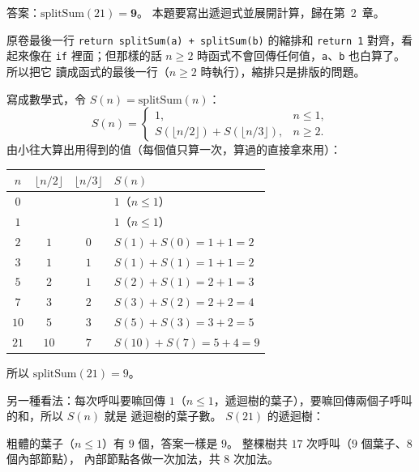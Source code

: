 \begin{pastsoln}
答案：$\mathrm{splitSum}(21) = \mathbf{9}$。 本題要寫出遞迴式並展開計算，歸在第~2~章。

原卷最後一行 \texttt{return splitSum(a) + splitSum(b)} 的縮排和 \texttt{return 1} 對齊，看起來像在
\texttt{if} 裡面；但那樣的話 $n \ge 2$ 時函式不會回傳任何值，\texttt{a}、\texttt{b} 也白算了。 所以把它
讀成函式的最後一行（$n \ge 2$ 時執行），縮排只是排版的問題。

寫成數學式，令 $S(n) = \mathrm{splitSum}(n)$：
\[
S(n) = \begin{cases} 1, & n \le 1, \\ S(\lfloor n/2 \rfloor) + S(\lfloor n/3 \rfloor), & n \ge 2. \end{cases}
\]
由小往大算出用得到的值（每個值只算一次，算過的直接拿來用）：
\begin{center}
\small
\begin{tabular}{cccl}
\toprule
$n$ & $\lfloor n/2 \rfloor$ & $\lfloor n/3 \rfloor$ & $S(n)$ \\
\midrule
$0$ & & & $1$（$n \le 1$） \\
$1$ & & & $1$（$n \le 1$） \\
$2$ & $1$ & $0$ & $S(1) + S(0) = 1 + 1 = 2$ \\
$3$ & $1$ & $1$ & $S(1) + S(1) = 1 + 1 = 2$ \\
$5$ & $2$ & $1$ & $S(2) + S(1) = 2 + 1 = 3$ \\
$7$ & $3$ & $2$ & $S(3) + S(2) = 2 + 2 = 4$ \\
$10$ & $5$ & $3$ & $S(5) + S(3) = 3 + 2 = 5$ \\
$21$ & $10$ & $7$ & $S(10) + S(7) = 5 + 4 = 9$ \\
\bottomrule
\end{tabular}
\end{center}
所以 $\mathrm{splitSum}(21) = 9$。

另一種看法：每次呼叫要嘛回傳 $1$（$n \le 1$，遞迴樹的葉子），要嘛回傳兩個子呼叫的和，所以 $S(n)$ 就是
遞迴樹的葉子數。 $S(21)$ 的遞迴樹：
\begin{center}
\end{center}
粗體的葉子（$n \le 1$）有 $9$ 個，答案一樣是 $9$。 整棵樹共 $17$ 次呼叫（$9$ 個葉子、$8$ 個內部節點），
內部節點各做一次加法，共 $8$ 次加法。
\end{pastsoln}
